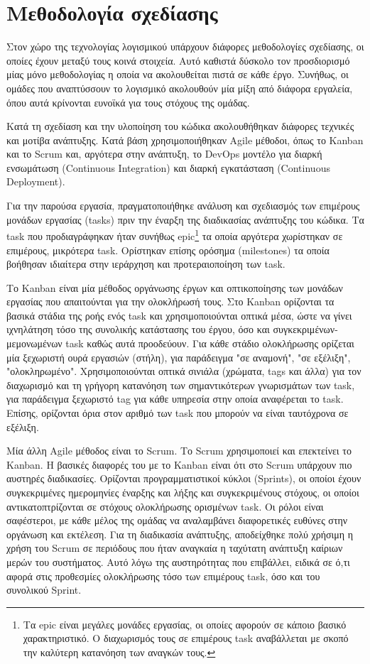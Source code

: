 \section{Μεθοδολογία σχεδίασης} \label{section:3-3-design-methodology}

Στον χώρο της τεχνολογίας λογισμικού υπάρχουν διάφορες μεθοδολογίες σχεδίασης, οι οποίες έχουν μεταξύ τους κοινά στοιχεία. Αυτό καθιστά δύσκολο τον προσδιορισμό μίας μόνο μεθοδολογίας η οποία να ακολουθείται πιστά σε κάθε έργο. Συνήθως, οι ομάδες που αναπτύσσουν το λογισμικό ακολουθούν μία μίξη από διάφορα εργαλεία, όπου αυτά κρίνονται ευνοϊκά για τους στόχους της ομάδας. %

Κατά τη σχεδίαση και την υλοποίηση του κώδικα ακολουθήθηκαν διάφορες τεχνικές και μοτίβα ανάπτυξης. Κατά βάση χρησιμοποιήθηκαν Agile μέθοδοι, όπως το Kanban και το Scrum και, αργότερα στην ανάπτυξη, το DevOps μοντέλο για διαρκή ενσωμάτωση (Continuous Integration) και διαρκή εγκατάσταση (Continuous Deployment).

Για την παρούσα εργασία, πραγματοποιήθηκε ανάλυση και σχεδιασμός των επιμέρους μονάδων εργασίας (tasks) πριν την έναρξη της διαδικασίας ανάπτυξης του κώδικα. Τα task που προδιαγράφηκαν ήταν συνήθως epic\footnote{Τα epic είναι μεγάλες μονάδες εργασίας, οι οποίες αφορούν σε κάποιο βασικό χαρακτηριστικό. Ο διαχωρισμός τους σε επιμέρους task αναβάλλεται με σκοπό την καλύτερη κατανόηση των αναγκών τους.} τα οποία αργότερα χωρίστηκαν σε επιμέρους, μικρότερα task. Ορίστηκαν επίσης ορόσημα (milestones) τα οποία βοήθησαν ιδιαίτερα στην ιεράρχηση και προτεραιοποίηση των task.

Το Kanban είναι μία μέθοδος οργάνωσης έργων και οπτικοποίησης των μονάδων εργασίας που απαιτούνται για την ολοκλήρωσή τους. Στο Kanban ορίζονται τα βασικά στάδια της ροής ενός task και χρησιμοποιούνται οπτικά μέσα, ώστε να γίνει ιχνηλάτηση τόσο της συνολικής κατάστασης του έργου, όσο και συγκεκριμένων-μεμονωμένων task καθώς αυτά προοδεύουν. Για κάθε στάδιο ολοκλήρωσης ορίζεται μία ξεχωριστή ουρά εργασιών (στήλη), για παράδειγμα "σε αναμονή", "σε εξέλιξη", "ολοκληρωμένο". Χρησιμοποιούνται οπτικά σινιάλα (χρώματα, tags και άλλα) για τον διαχωρισμό και τη γρήγορη κατανόηση των σημαντικότερων γνωρισμάτων των task, για παράδειγμα ξεχωριστό tag για κάθε υπηρεσία στην οποία αναφέρεται το task. Επίσης, ορίζονται όρια στον αριθμό των task που μπορούν να είναι ταυτόχρονα σε εξέλιξη.

Μία άλλη Agile μέθοδος είναι το Scrum. Το Scrum χρησιμοποιεί και επεκτείνει το Kanban. Η βασικές διαφορές του με το Kanban είναι ότι στο Scrum υπάρχουν πιο αυστηρές διαδικασίες. Ορίζονται προγραμματιστικοί κύκλοι (Sprints), οι οποίοι έχουν συγκεκριμένες ημερομηνίες έναρξης και λήξης και συγκεκριμένους στόχους, οι οποίοι αντικατοπτρίζονται σε στόχους ολοκλήρωσης ορισμένων task. Οι ρόλοι είναι σαφέστεροι, με κάθε μέλος της ομάδας να αναλαμβάνει διαφορετικές ευθύνες στην οργάνωση και εκτέλεση. Για τη διαδικασία ανάπτυξης, αποδείχθηκε πολύ χρήσιμη η χρήση του Scrum σε περιόδους που ήταν αναγκαία η ταχύτατη ανάπτυξη καίριων μερών του συστήματος. Αυτό λόγω της αυστηρότητας που επιβάλλει, ειδικά σε ό,τι αφορά στις προθεσμίες ολοκλήρωσης τόσο των επιμέρους task, όσο και του συνολικού Sprint.

